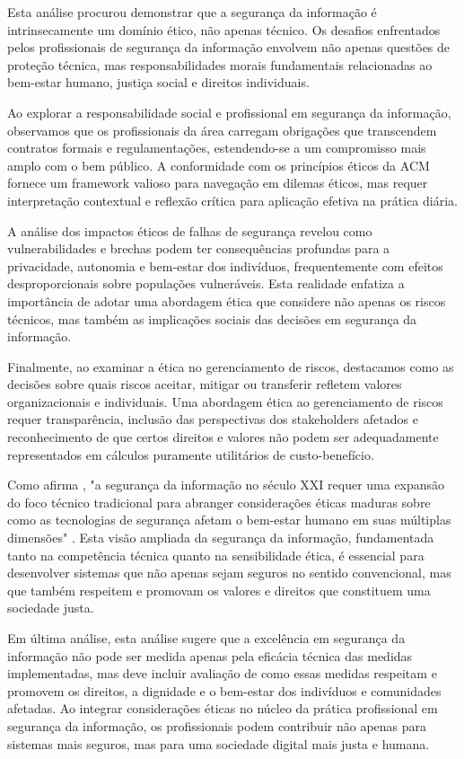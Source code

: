 
Esta análise procurou demonstrar que a segurança da informação é intrinsecamente um domínio ético, não apenas técnico. Os desafios enfrentados pelos profissionais de segurança da informação envolvem não apenas questões de proteção técnica, mas responsabilidades morais fundamentais relacionadas ao bem-estar humano, justiça social e direitos individuais.

Ao explorar a responsabilidade social e profissional em segurança da informação, observamos que os profissionais da área carregam obrigações que transcendem contratos formais e regulamentações, estendendo-se a um compromisso mais amplo com o bem público. A conformidade com os princípios éticos da ACM fornece um framework valioso para navegação em dilemas éticos, mas requer interpretação contextual e reflexão crítica para aplicação efetiva na prática diária.

A análise dos impactos éticos de falhas de segurança revelou como vulnerabilidades e brechas podem ter consequências profundas para a privacidade, autonomia e bem-estar dos indivíduos, frequentemente com efeitos desproporcionais sobre populações vulneráveis. Esta realidade enfatiza a importância de adotar uma abordagem ética que considere não apenas os riscos técnicos, mas também as implicações sociais das decisões em segurança da informação.

Finalmente, ao examinar a ética no gerenciamento de riscos, destacamos como as decisões sobre quais riscos aceitar, mitigar ou transferir refletem valores organizacionais e individuais. Uma abordagem ética ao gerenciamento de riscos requer transparência, inclusão das perspectivas dos stakeholders afetados e reconhecimento de que certos direitos e valores não podem ser adequadamente representados em cálculos puramente utilitários de custo-benefício.

Como afirma \citeauthor{acquisti2015privacy}, "a segurança da informação no século XXI requer uma expansão do foco técnico tradicional para abranger considerações éticas maduras sobre como as tecnologias de segurança afetam o bem-estar humano em suas múltiplas dimensões" \cite{acquisti2015privacy}. Esta visão ampliada da segurança da informação, fundamentada tanto na competência técnica quanto na sensibilidade ética, é essencial para desenvolver sistemas que não apenas sejam seguros no sentido convencional, mas que também respeitem e promovam os valores e direitos que constituem uma sociedade justa.

Em última análise, esta análise sugere que a excelência em segurança da informação não pode ser medida apenas pela eficácia técnica das medidas implementadas, mas deve incluir avaliação de como essas medidas respeitam e promovem os direitos, a dignidade e o bem-estar dos indivíduos e comunidades afetadas. Ao integrar considerações éticas no núcleo da prática profissional em segurança da informação, os profissionais podem contribuir não apenas para sistemas mais seguros, mas para uma sociedade digital mais justa e humana. 